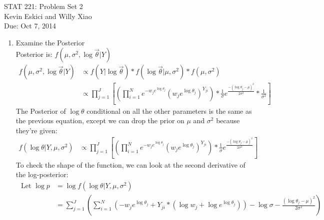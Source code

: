 \documentclass[paper=a4, fontsize=11pt]{scrartcl}
\newcommand{\parens}[1]{ \left( #1 \right) }
\begin{document}
  \begin{center}
    STAT 221: Problem Set 2 \\
    Kevin Eskici and Willy Xiao \\
    Due: Oct 7, 2014
  \end{center}
  \begin{enumerate}
    \item Examine the Posterior \\

      Posterior is: $f(\mu, \sigma^2, \log{\vec{\theta}} | Y)$
      \begin{align*}
        f(\mu, \sigma^2, \log{\vec{\theta}} | Y) &\propto f(Y|\log{\vec{\theta}}) * f(\log{\vec{\theta}}|\mu, \sigma^2) * f(\mu, \sigma^2) \\
        &\propto \prod_{j=1}^{J}{
          \left[ \parens{
            \prod_{i=1}^N{
              e^{-w_je^{\log{\theta_j}}}\parens{w_je^{\log{\theta_j}}}^{Y_{ji}}
            }}
            * \frac{1}{\sigma}e^{
                                  \frac{-(\log{\theta_j}-\mu)^2}{2\sigma^2}
                                }
            * \frac{1}{\sigma^2}
          \right]
        }
      \end{align*}
      The Posterior of $\log{\theta}$ conditional on all the other parameters is the same as the previous equation, except we can drop the prior on $\mu$ and $\sigma^2$ because they're given:
      \begin{align*}
        f(\log{\theta} | Y, \mu, \sigma^2)
          &\propto \prod_{j=1}^{J}{
            \left[ \parens{
              \prod_{i=1}^N{
                e^{-w_je^{\log{\theta_j}}}\parens{w_je^{\log{\theta_j}}}^{Y_{ji}}
              }}
              * \frac{1}{\sigma}e^{
                                    \frac{-(\log{\theta_j}-\mu)^2}{2\sigma^2}
                                  }
            \right]
          }
      \end{align*}
      To check the shape of the function, we can look at the second derivative of the log-posterior:
      \begin{align*}
        \text{ Let } \log{p} &= \log{f(\log{\theta} | Y, \mu, \sigma^2)} \\
          &= \sum_{j = 1}^J{
            \parens{
              \sum_{i = 1}^N{ \parens{
                -w_je^{ \log{ \theta_j }} + Y_{ji}*\parens{ \log{w_j} + \log{e^{\log{\theta_j}}} }
              }}
              - \log{\sigma}
              - \frac{ \parens{ \log{\theta_j} - \mu}^2}{2\sigma^2}
            }
          } \\

\end{align*}
\end{enumerate}
\end{document}
